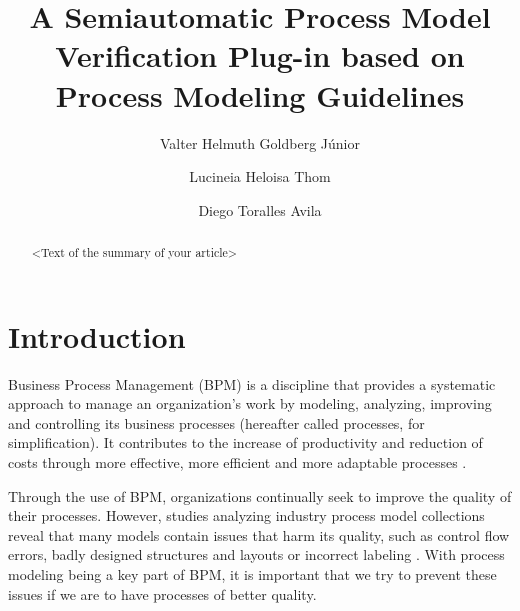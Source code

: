 \documentclass{llncs}
\title{A Semiautomatic Process Model Verification Plug-in based on Process Modeling Guidelines}
\author{Valter Helmuth Goldberg Júnior\inst{1} \and Lucineia Heloisa Thom\inst{1} \and Diego Toralles Avila\inst{1}}
\institute{	Department of Informatics, Federal University of Rio Grande do Sul, UFRGS, Porto Alegre, Brazil\\%
				\email{\{EMAILDOWALTER,lucineia,dtavila\}@inf.ufrgs.br}
}
\begin{document}
\maketitle

\begin{abstract}%
	<Text of the summary of your article>
\end{abstract}


\section{Introduction} \label{Introduction}

Business Process Management (BPM) is a discipline that provides a systematic approach to manage an organization's work by modeling, analyzing, improving and controlling its business processes (hereafter called processes, for simplification). It contributes to the increase of productivity and reduction of costs through more effective, more efficient and more adaptable processes \cite{aalst:2013}. %

Through the use of BPM, organizations continually seek to improve the quality of their processes. However, studies analyzing industry process model collections reveal that many models contain issues that harm its quality, such as control flow errors, badly designed structures and layouts or incorrect labeling \cite{Detection and Prediction of Errors in EPCs of the SAP Reference Model.} \cite{What we can learn from Quality Issues of BPMN Models from Industry}. With process modeling being a key part of BPM, it is important that we try to prevent these issues if we are to have processes of better quality.

\end{document}
